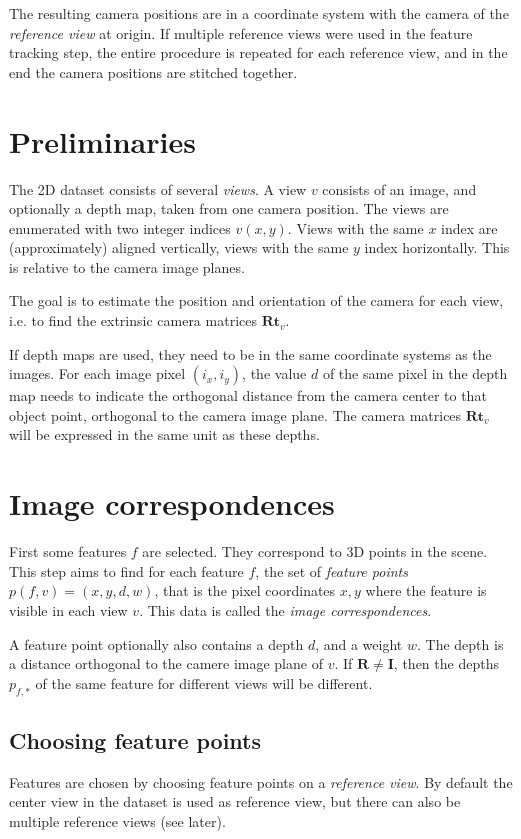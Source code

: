 \documentclass{scrreprt}
\newcommand{\matr}[1]{\mathbf{#1}}
\begin{document}
The resulting camera positions are in a coordinate system with the camera of the \emph{reference view} at origin. If multiple reference views were used in the feature tracking step, the entire procedure is repeated for each reference view, and in the end the camera positions are stitched together.



\section{Preliminaries}
The 2D dataset consists of several \emph{views}. A view $v$ consists of an image, and optionally a depth map, taken from one camera position. The views are enumerated with two integer indices $v(x,y)$. Views with the same $x$ index are (approximately) aligned vertically, views with the same $y$ index horizontally. This is relative to the camera image planes.

The goal is to estimate the position and orientation of the camera for each view, i.e. to find the extrinsic camera matrices $\matr{Rt}_v$.

If depth maps are used, they need to be in the same coordinate systems as the images. For each image pixel $(i_x,i_y)$, the value $d$ of the same pixel in the depth map needs to indicate the orthogonal distance from the camera center to that object point, orthogonal to the camera image plane. The camera matrices $\matr{Rt}_v$ will be expressed in the same unit as these depths.

 
\section{Image correspondences}
First some features $f$ are selected. They correspond to 3D points in the scene. This step aims to find for each feature $f$, the set of \emph{feature points} $p(f,v) = (x,y,d,w)$, that is the pixel coordinates $x,y$ where the feature is visible in each view $v$. This data is called the \emph{image correspondences}.

A feature point optionally also contains a depth $d$, and a weight $w$. The depth is a distance orthogonal to the camere image plane of $v$. If $\matr{R} \neq \matr{I}$, then the depths $p_{f,*}$ of the same feature for different views will be different.


\subsection{Choosing feature points}
Features are chosen by choosing feature points on a \emph{reference view}. By default the center view in the dataset is used as reference view, but there can also be multiple reference views (see later).
\end{document}
